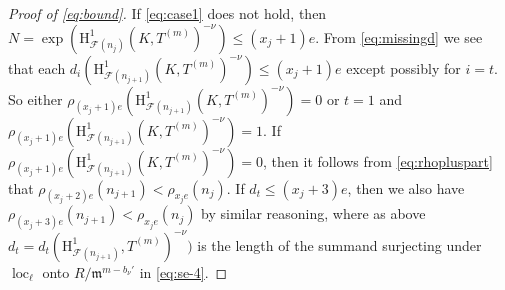 \documentclass[a4paper,10pt]{amsart}
\numberwithin{equation}{section}
\numberwithin{equation}{section}
\theoremstyle{plain}
\theoremstyle{definition}
\theoremstyle{definition}
\theoremstyle{plain}
\theoremstyle{plain}
\theoremstyle{plain}
\theoremstyle{plain}
\newcommand{\F}{\mathcal{F}}
\DeclareMathOperator{\loc}{loc}
\newcommand{\cF}{\mathcal{F}}
\newcommand{\Fcal}{\mathcal{F}}
\newcommand{\fm}{\mathfrak{m}}
\newcommand{\rH}{\mathrm{H}}
\begin{document}
\begin{proof}[Proof of \eqref{eq:bound}]

If \eqref{eq:case1} does not hold, then $N=\operatorname{exp} ( \rH^1_{\Fcal(n_j)}(K,T^{(m)})^{-\nu})\leq (x_j+1)e$.
From \eqref{eq:missingd} we see that each $d_i(\rH^1_{\F(n_{j+1})}(K,T^{(m)})^{-\nu})\leq (x_j+1)e$ except possibly for $i=t$. 
So either $\rho_{(x_j+1)e}(\rH^1_{\F(n_{j+1})}(K,T^{(m)})^{-\nu})=0$ or $t=1$ and $\rho_{(x_j+1)e}(\rH^1_{\F(n_{j+1})}(K,T^{(m)})^{-\nu})=1$.
If $\rho_{(x_j+1)e}(\rH^1_{\F(n_{j+1})}(K,T^{(m)})^{-\nu})=0$, then it follows from \eqref{eq:rhopluspart} that 
$\rho_{(x_j+2)e}(n_{j+1}) < \rho_{x_je}(n_j)$. 
If $d_t \leq (x_j+3)e$, then we also have $\rho_{(x_j+3)e}(n_{j+1}) < \rho_{x_je}(n_j)$ by similar reasoning, where as above $d_t = d_t(\rH^1_{\cF(n_{j+1})},T^{(m)})^{-\nu})$ is the length of the summand
surjecting under $\loc_\ell$ onto $R/\fm^{m-b_{\nu}'}$ in \eqref{eq:se-4}.


\end{proof}
\end{document}
